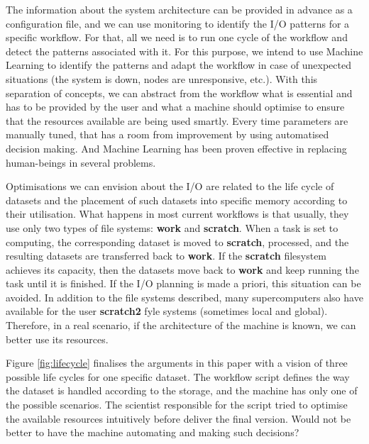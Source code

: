 \documentclass[a4paper]{article}
\begin{document}
{{{{The information about the system architecture can be provided in advance as a configuration file, and we can use monitoring to identify the I/O patterns for a specific workflow. For that, all we need is to run one cycle of the workflow and detect the patterns associated with it. For this purpose, we intend to use Machine Learning to identify the patterns and adapt the workflow in case of unexpected situations (the system is down, nodes are unresponsive, etc.).
With this separation of concepts, we can abstract from the workflow what is essential and has to be provided by the user and what a machine should optimise to ensure that the resources available are being used smartly. Every time parameters are manually tuned, that has a room from improvement by using automatised decision making. And Machine Learning has been proven effective in replacing human-beings in several problems.

Optimisations we can envision about the I/O are related to the life cycle of datasets and the placement of such datasets into specific memory according to their utilisation. What happens in most current workflows is that usually, they use only two types of file systems: \textbf{work} and \textbf{scratch}. When a task is set to computing, the corresponding dataset is moved to \textbf{scratch}, processed, and the resulting datasets are transferred back to \textbf{work}. If the \textbf{scratch} filesystem achieves its capacity, then the datasets move back to \textbf{work} and keep running the task until it is finished. If the I/O planning is made a priori, this situation can be avoided.
In addition to the file systems described, many supercomputers also have available for the user \textbf{scratch2} fyle systems (sometimes local and global). Therefore, in a real scenario, if the architecture of the machine is known, we can better use its resources.

Figure \ref{fig:lifecycle} finalises the arguments in this paper with a vision of three possible life cycles for one specific dataset. The workflow script defines the way the dataset is handled according to the storage, and the machine has only one of the possible scenarios. The scientist responsible for the script tried to optimise the available resources intuitively before deliver the final version. Would not be better to have the machine automating and making such decisions?

}}}}
\end{document}
